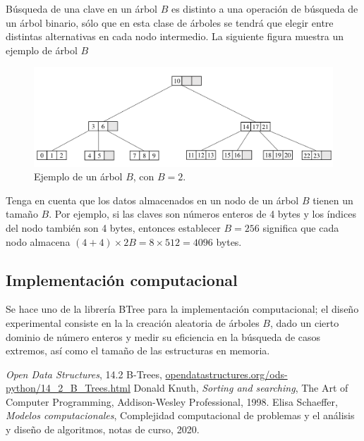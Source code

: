 \documentclass[letterpaper,11pt]{article}
\begin{document}
Búsqueda de una clave en un árbol $B$ es distinto a una operación de búsqueda de un árbol binario, sólo que en esta clase de árboles se tendrá que elegir entre distintas alternativas en cada nodo intermedio. La siguiente figura muestra un ejemplo de árbol $B$

\begin{figure}[h!]
  \centering
  \includegraphics[width=\textwidth]{img/btree.pdf}
  \caption{Ejemplo de un árbol $B$, con $B=2$.}
  \label{fig:ie}
\end{figure}

Tenga en cuenta que los datos almacenados en un nodo de un árbol $B$ tienen un tamaño $B$. Por ejemplo, si las claves son números enteros de 4 bytes y los índices del nodo también son 4 bytes, entonces establecer $ B=256 $ significa que cada nodo almacena $\displaystyle (4+4)\times 2B= 8\times512=4096$ bytes.

\subsection{Implementación computacional}

Se hace uno de la librería BTree para la implementación computacional; el diseño experimental consiste en la la creación aleatoria de árboles $B$, dado un cierto dominio de número enteros y medir su eficiencia en la búsqueda de casos extremos, así como el tamaño de las estructuras en memoria.
 

\begin{thebibliography}{0}
  \textit{Open Data Structures}, 14.2 B-Trees, \url{opendatastructures.org/ods-python/14_2_B_Trees.html}
   Donald Knuth, \textit{Sorting and searching}, The Art of Computer Programming, Addison-Wesley Professional, 1998.
   Elisa Schaeffer, \textit{Modelos computacionales}, Complejidad computacional de problemas y el análisis y diseño de algoritmos, notas de curso, 2020.
\end{thebibliography}
\end{document}

